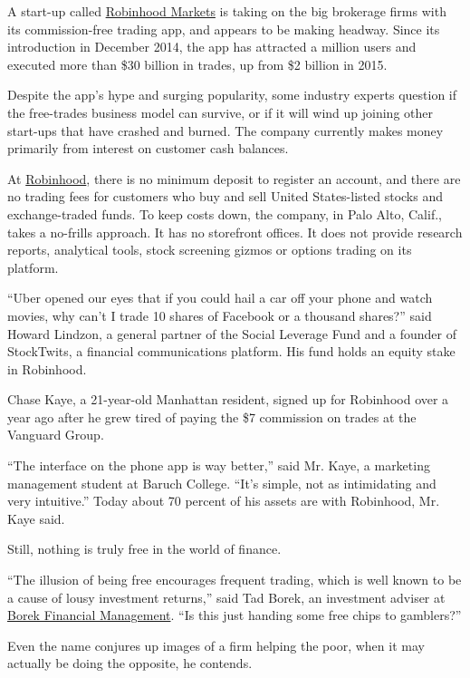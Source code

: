 A start-up called \href{https://www.robinhood.com/company/}{Robinhood
Markets} is taking on the big brokerage firms with its commission-free
trading app, and appears to be making headway. Since its introduction in
December 2014, the app has attracted a million users and executed more
than \$30 billion in trades, up from \$2 billion in 2015.

Despite the app's hype and surging popularity, some industry experts
question if the free-trades business model can survive, or if it will
wind up joining other start-ups that have crashed and burned. The
company currently makes money primarily from interest on customer cash
balances.

At
\href{https://www.nytimes3xbfgragh.onion/2020/07/08/technology/robinhood-risky-trading.html}{Robinhood},
there is no minimum deposit to register an account, and there are no
trading fees for customers who buy and sell United States-listed stocks
and exchange-traded funds. To keep costs down, the company, in Palo
Alto, Calif., takes a no-frills approach. It has no storefront offices.
It does not provide research reports, analytical tools, stock screening
gizmos or options trading on its platform.

``Uber opened our eyes that if you could hail a car off your phone and
watch movies, why can't I trade 10 shares of Facebook or a thousand
shares?'' said Howard Lindzon, a general partner of the Social Leverage
Fund and a founder of StockTwits, a financial communications platform.
His fund holds an equity stake in Robinhood.

Chase Kaye, a 21-year-old Manhattan resident, signed up for Robinhood
over a year ago after he grew tired of paying the \$7 commission on
trades at the Vanguard Group.

``The interface on the phone app is way better,'' said Mr. Kaye, a
marketing management student at Baruch College. ``It's simple, not as
intimidating and very intuitive.'' Today about 70 percent of his assets
are with Robinhood, Mr. Kaye said.

Still, nothing is truly free in the world of finance.

``The illusion of being free encourages frequent trading, which is well
known to be a cause of lousy investment returns,'' said Tad Borek, an
investment adviser at \href{https://www.borekfinancial.com/}{Borek
Financial Management}. ``Is this just handing some free chips to
gamblers?''

Even the name conjures up images of a firm helping the poor, when it may
actually be doing the opposite, he contends.

